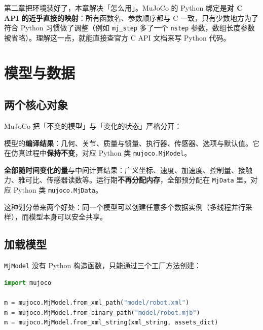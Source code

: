 
第二章把环境装好了，本章解决「怎么用」。MuJoCo 的 Python 绑定是\textbf{对 C API 的近乎直接的映射}：所有函数名、参数顺序都与 C 一致，只有少数地方为了符合 Python 习惯做了调整（例如 \texttt{mj\_step} 多了一个 \texttt{nstep} 参数，数组长度参数被省略）。理解这一点，就能直接查官方 C API 文档来写 Python 代码。

\section{模型与数据}

\subsection{两个核心对象}

MuJoCo 把「不变的模型」与「变化的状态」严格分开：

\begin{definition}[mjModel]
	模型的\textbf{编译结果}：几何、关节、质量与惯量、执行器、传感器、选项与默认值。它在仿真过程中\textbf{保持不变}，对应 Python 类 \texttt{mujoco.MjModel}。
\end{definition}

\begin{definition}[mjData]
	\textbf{全部随时间变化的量}与中间计算结果：广义坐标、速度、加速度、控制量、接触力、雅可比、传感器读数等。运行期\textbf{不再分配内存}，全部预分配在 \texttt{MjData} 里。对应 Python 类 \texttt{mujoco.MjData}。
\end{definition}

这种划分带来两个好处：同一个模型可以创建任意多个数据实例（多线程并行采样），而模型本身可以安全共享。

\subsection{加载模型}

\texttt{MjModel} 没有 Python 构造函数，只能通过三个工厂方法创建：

\begin{lstlisting}[style=code, language=Python]
import mujoco

m = mujoco.MjModel.from_xml_path("model/robot.xml")
m = mujoco.MjModel.from_binary_path("model/robot.mjb")
m = mujoco.MjModel.from_xml_string(xml_string, assets_dict)
\end{lstlisting}

